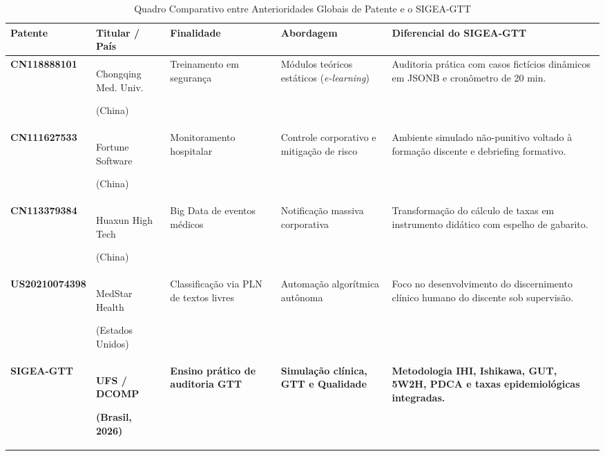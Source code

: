 \begin{table}[!ht]
\centering
\caption{Quadro Comparativo entre Anterioridades Globais de Patente e o SIGEA-GTT}
\label{tab_comparativo_patentes}
\footnotesize
\begin{tabularx}{\textwidth}{p{2.5cm} p{2.8cm} p{2.4cm} p{2.8cm} X}
\toprule
\textbf{Patente} & \textbf{Titular / País} & \textbf{Finalidade} & \textbf{Abordagem} & \textbf{Diferencial do SIGEA-GTT} \\
\midrule
\textbf{CN118888101} & Chongqing Med. Univ. \par (China) & Treinamento em segurança & Módulos teóricos estáticos (\textit{e-learning}) & Auditoria prática com casos fictícios dinâmicos em JSONB e cronômetro de 20 min. \\
\addlinespace
\textbf{CN111627533} & Fortune Software \par (China) & Monitoramento hospitalar & Controle corporativo e mitigação de risco & Ambiente simulado não-punitivo voltado à formação discente e debriefing formativo. \\
\addlinespace
\textbf{CN113379384} & Huaxun High Tech \par (China) & Big Data de eventos médicos & Notificação massiva corporativa & Transformação do cálculo de taxas em instrumento didático com espelho de gabarito. \\
\addlinespace
\textbf{US20210074398} & MedStar Health \par (Estados Unidos) & Classificação via PLN de textos livres & Automação algorítmica autônoma & Foco no desenvolvimento do discernimento clínico humano do discente sob supervisão. \\
\addlinespace
\textbf{SIGEA-GTT} & \textbf{UFS / DCOMP} \par \textbf{(Brasil, 2026)} & \textbf{Ensino prático de auditoria GTT} & \textbf{Simulação clínica, GTT e Qualidade} & \textbf{Metodologia IHI, Ishikawa, GUT, 5W2H, PDCA e taxas epidemiológicas integradas.} \\
\bottomrule
\end{tabularx}
\end{table}

